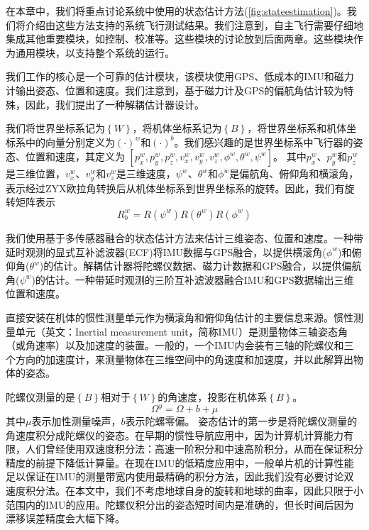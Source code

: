 \documentclass[
  type=master
]{gdutthesis}
\begin{document}
在本章中，我们将重点讨论系统中使用的状态估计方法(\autoref{fig:stateestimation})。我们将介绍由这些方法支持的系统飞行测试结果。我们注意到，自主飞行需要仔细地集成其他重要模块，如控制、校准等。这些模块的讨论放到后面两章。这些模块作为通用模块，以支持整个系统的运行。

我们工作的核心是一个可靠的估计模块，该模块使用GPS、低成本的IMU和磁力计输出姿态、位置和速度。我们注意到，基于磁力计及GPS的偏航角估计较为特殊，因此，我们提出了一种解耦估计器设计。

我们将世界坐标系记为$\left\{ W \right\}$，将机体坐标系记为$\left\{ B \right\}$，将世界坐标系和机体坐标系中的向量分别定义为$(\cdot)^w$和$(\cdot)^b$。我们感兴趣的是世界坐标系中飞行器的姿态、位置和速度，其定义为
$[p^w_x , p^w_y , p^w_z , v^w_x , v^w_y , v^w_z , \phi^w , \theta^w , \psi^w]$。
其中$p^w_x$、$p^w_y$和$p^w_z$是三维位置，$v^w_x$、$v^w_y$和$v^w_z$是三维速度，$\psi^w$、$\theta^w$和$\phi^w$是偏航角、俯仰角和横滚角，表示经过ZYX欧拉角转换后从机体坐标系到世界坐标系的旋转。因此，我们有旋转矩阵表示
\begin{equation}\label{eq:rotationmatrix}
	R_{b}^{w}=R(\psi^w)R(\theta^w)R(\phi^w)
\end{equation}

我们使用基于多传感器融合的状态估计方法来估计三维姿态、位置和速度。一种带延时观测的显式互补滤波器(ECF)将IMU数据与GPS融合，以提供横滚角($\phi^w$)和俯仰角($\theta^w$)的估计。解耦估计器将陀螺仪数据、磁力计数据和GPS融合，以提供偏航角($\psi^w$)的估计。一种带延时观测的三阶互补滤波器融合IMU和GPS数据输出三维位置和速度。

直接安装在机体的惯性测量单元作为横滚角和俯仰角估计的主要信息来源。惯性测量单元（英文：Inertial measurement unit，简称IMU）是测量物体三轴姿态角（或角速率）以及加速度的装置。一般的，一个IMU内会装有三轴的陀螺仪和三个方向的加速度计，来测量物体在三维空间中的角速度和加速度，并以此解算出物体的姿态。

陀螺仪测量的是$\left\{ B \right\}$相对于$\left\{ W \right\}$的角速度，投影在机体系$\left\{ B \right\}$。
\begin{equation}\label{eq:gyromodel}
	\Omega^y=\Omega+b+\mu
\end{equation}
其中$\mu$表示加性测量噪声，$b$表示陀螺零偏。
姿态估计的第一步是将陀螺仪测量的角速度积分成陀螺仪的姿态。在早期的惯性导航应用中，因为计算机计算能力有限，人们曾经使用双速度积分法：高速一阶积分和中速高阶积分，从而在保证积分精度的前提下降低计算量\cite{savage1998strapdown}。在现在IMU的低精度应用中，一般单片机的计算性能足以保证在IMU的测量带宽内使用最精确的积分方法，因此我们没有必要讨论双速度积分法。在本文中，我们不考虑地球自身的旋转和地球的曲率，因此只限于小范围内的IMU的应用。陀螺仪积分出的姿态短时间内是准确的，但长时间后因为漂移误差精度会大幅下降\cite{钱华明2010基于}。
\end{document}
